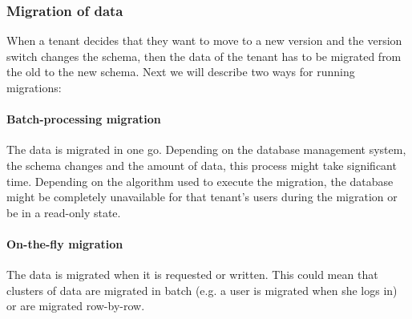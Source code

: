 \subsubsection{Migration of data}

When a tenant decides that they want to move to a new version and the version switch changes the schema, then the data of the tenant has to be migrated from the old to the new schema. Next we will describe two ways for running migrations:

\paragraph{Batch-processing migration} The data is migrated in one go. Depending on the database management system, the schema changes and the amount of data, this process might take significant time. Depending on the algorithm used to execute the migration, the database might be completely unavailable for that tenant's users during the migration or be in a read-only state.

\paragraph{On-the-fly migration} The data is migrated when it is requested or written. This could mean that clusters of data are migrated in batch (e.g. a user is migrated when she logs in) or are migrated row-by-row.

